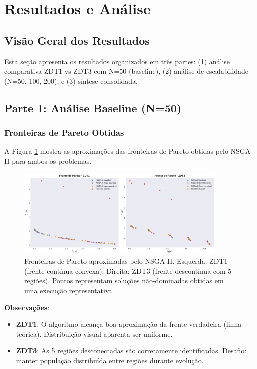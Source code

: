 \section{Resultados e Análise}

\subsection{Visão Geral dos Resultados}
Esta seção apresenta os resultados organizados em três partes: (1) análise comparativa ZDT1 vs ZDT3 com N=50 (baseline), (2) análise de escalabilidade (N=50, 100, 200), e (3) síntese consolidada.

\subsection{Parte 1: Análise Baseline (N=50)}

\subsubsection{Fronteiras de Pareto Obtidas}
A Figura \ref{fig:pareto_fronts} mostra as aproximações das fronteiras de Pareto obtidas pelo NSGA-II para ambos os problemas.

\begin{figure}[h]
\centering
\includegraphics[width=0.90\textwidth]{../plots/A_pareto_fronts.pdf}
\caption{Fronteiras de Pareto aproximadas pelo NSGA-II. Esquerda: ZDT1 (frente contínua convexa); Direita: ZDT3 (frente descontínua com 5 regiões). Pontos representam soluções não-dominadas obtidas em uma execução representativa.}
\label{fig:pareto_fronts}
\end{figure}

\textbf{Observações}:
\begin{itemize}
  \item \textbf{ZDT1}: O algoritmo alcança boa aproximação da frente verdadeira (linha teórica). Distribuição visual aparenta ser uniforme.
  \item \textbf{ZDT3}: As 5 regiões desconectadas são corretamente identificadas. Desafio: manter população distribuída entre regiões durante evolução.
\end{itemize}

